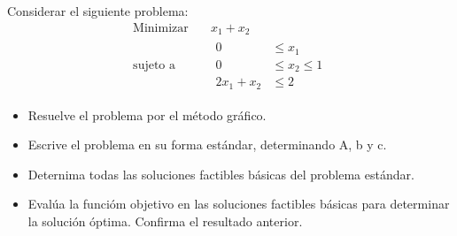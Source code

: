 \documentclass{article}
\begin{document}
Considerar el siguiente problema:
\begin{equation*}
  \begin{aligned}
    \text{Minimizar}\quad & x_1+x_2\\
    \text{sujeto a}\quad &
    \begin{aligned}
      0 & \leq x_1\\
      0 & \leq x_2 \leq 1\\
      2x_1+x_2 & \leq 2
    \end{aligned}   
\end{aligned}
\end{equation*}
\begin{itemize}
  \item Resuelve el problema por el método gráfico.
  \item Escrive el problema en su forma estándar, determinando A, b y c.
  \item Deternima todas las soluciones factibles básicas del problema estándar.
  \item Evalúa la funcióm objetivo en las soluciones factibles básicas para determinar la solución óptima. Confirma el resultado anterior.
  \end{itemize}
  
\end{document}
